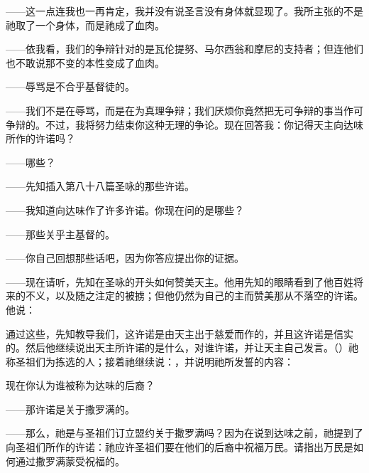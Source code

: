 ——这一点连我也一再肯定，我并没有说圣言没有身体就显现了。我所主张的不是祂取了一个身体，而是祂成了血肉。\par

——依我看，我们的争辩针对的是瓦伦提努、马尔西翁和摩尼的支持者；但连他们也不敢说那不变的本性变成了血肉。\par

——辱骂是不合乎基督徒的。\par

——我们不是在辱骂，而是在为真理争辩；我们厌烦你竟然把无可争辩的事当作可争辩的。不过，我将努力结束你这种无理的争论。现在回答我：你记得天主向达味所作的许诺吗？\par

——哪些？\par

——先知插入第八十八篇圣咏的那些许诺。\par

——我知道向达味作了许多许诺。你现在问的是哪些？\par

——那些关乎主基督的。\par

——你自己回想那些话吧，因为你答应提出你的证据。\par

——现在请听，先知在圣咏的开头如何赞美天主。他用先知的眼睛看到了他百姓将来的不义，以及随之注定的被掳；但他仍然为自己的主而赞美那从不落空的许诺。他说：\par

通过这些，先知教导我们，这许诺是由天主出于慈爱而作的，并且这许诺是信实的。然后他继续说出天主所许诺的是什么，对谁许诺，并让天主自己发言。（）祂称圣祖们为拣选的人；接着祂继续说：，并说明祂所发誓的内容：\par

现在你认为谁被称为达味的后裔？\par

——那许诺是关于撒罗满的。\par

——那么，祂是与圣祖们订立盟约关于撒罗满吗？因为在说到达味之前，祂提到了向圣祖们所作的许诺：祂应许圣祖们要在他们的后裔中祝福万民。请指出万民是如何通过撒罗满蒙受祝福的。\par

